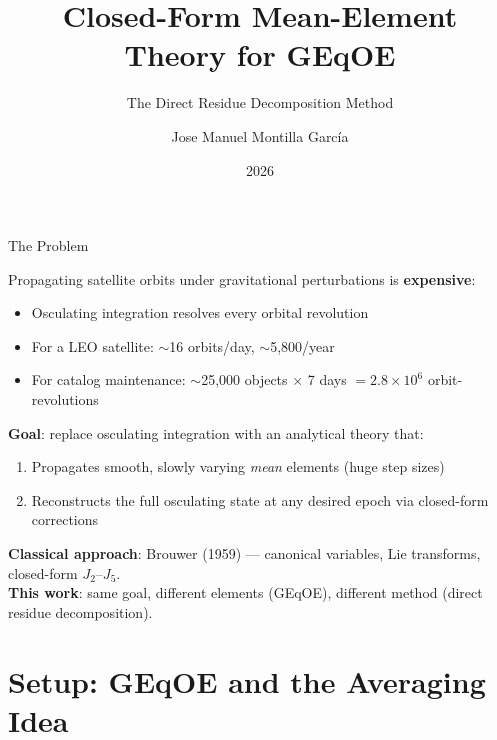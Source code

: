\documentclass[aspectratio=169, 11pt]{beamer}
\title{Closed-Form Mean-Element Theory for GEqOE}
\subtitle{The Direct Residue Decomposition Method}
\author{Jose Manuel Montilla Garc\'ia}
\date{2026}
\institute{}
\begin{document}
\maketitle

\begin{frame}{The Problem}

Propagating satellite orbits under gravitational perturbations is
\textbf{expensive}:

\begin{itemize}\setlength{\itemsep}{0.1em}
    \item Osculating integration resolves every orbital revolution
    \item For a LEO satellite: $\sim$16 orbits/day, $\sim$5{,}800/year
    \item For catalog maintenance: $\sim$25{,}000 objects $\times$ 7 days
          $= 2.8 \times 10^6$ orbit-revolutions
\end{itemize}

\vspace{0.2em}
\textbf{Goal}: replace osculating integration with an
\alert{analytical theory} that:

\begin{enumerate}\setlength{\itemsep}{0.1em}
    \item Propagates smooth, slowly varying \emph{mean} elements
          (huge step sizes)
    \item Reconstructs the full osculating state at any desired epoch
          via closed-form corrections
\end{enumerate}

\vspace{0.2em}
\textbf{Classical approach}: Brouwer (1959) --- canonical variables,
Lie transforms, closed-form $J_2$--$J_5$.\\[0.1em]
\textbf{This work}: same goal, different elements (GEqOE), different
method (\alert{direct residue decomposition}).

\end{frame}

\section{Setup: GEqOE and the Averaging Idea}
\end{document}
